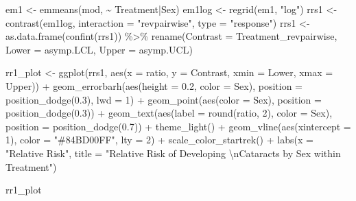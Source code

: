 \documentclass[
]{article}
\newenvironment{Shaded}{\begin{snugshade}}{\end{snugshade}}
\newcommand{\AttributeTok}[1]{\textcolor[rgb]{0.77,0.63,0.00}{#1}}
\newcommand{\DecValTok}[1]{\textcolor[rgb]{0.00,0.00,0.81}{#1}}
\newcommand{\FloatTok}[1]{\textcolor[rgb]{0.00,0.00,0.81}{#1}}
\newcommand{\FunctionTok}[1]{\textcolor[rgb]{0.00,0.00,0.00}{#1}}
\newcommand{\NormalTok}[1]{#1}
\newcommand{\OtherTok}[1]{\textcolor[rgb]{0.56,0.35,0.01}{#1}}
\newcommand{\SpecialCharTok}[1]{\textcolor[rgb]{0.00,0.00,0.00}{#1}}
\newcommand{\StringTok}[1]{\textcolor[rgb]{0.31,0.60,0.02}{#1}}
\begin{document}
\begin{Shaded}
\begin{Highlighting}[]
\NormalTok{em1 }\OtherTok{\textless{}{-}} \FunctionTok{emmeans}\NormalTok{(mod, }\SpecialCharTok{\textasciitilde{}}\NormalTok{ Treatment}\SpecialCharTok{|}\NormalTok{Sex)}
\NormalTok{em1log }\OtherTok{\textless{}{-}} \FunctionTok{regrid}\NormalTok{(em1, }\StringTok{"log"}\NormalTok{)}
\NormalTok{rrs1 }\OtherTok{\textless{}{-}} \FunctionTok{contrast}\NormalTok{(em1log, }\AttributeTok{interaction =} \StringTok{"revpairwise"}\NormalTok{, }\AttributeTok{type =} \StringTok{"response"}\NormalTok{)}
\NormalTok{rrs1 }\OtherTok{\textless{}{-}} \FunctionTok{as.data.frame}\NormalTok{(}\FunctionTok{confint}\NormalTok{(rrs1)) }\SpecialCharTok{\%\textgreater{}\%}
  \FunctionTok{rename}\NormalTok{(}\AttributeTok{Contrast =}\NormalTok{ Treatment\_revpairwise, }\AttributeTok{Lower =}\NormalTok{ asymp.LCL, }\AttributeTok{Upper =}\NormalTok{ asymp.UCL)}

\NormalTok{rr1\_plot }\OtherTok{\textless{}{-}} \FunctionTok{ggplot}\NormalTok{(rrs1, }\FunctionTok{aes}\NormalTok{(}\AttributeTok{x =}\NormalTok{ ratio, }\AttributeTok{y =}\NormalTok{ Contrast, }\AttributeTok{xmin =}\NormalTok{ Lower, }\AttributeTok{xmax =}\NormalTok{ Upper)) }\SpecialCharTok{+}
  \FunctionTok{geom\_errorbarh}\NormalTok{(}\FunctionTok{aes}\NormalTok{(}\AttributeTok{height =} \FloatTok{0.2}\NormalTok{, }\AttributeTok{color =}\NormalTok{ Sex),}
                 \AttributeTok{position =} \FunctionTok{position\_dodge}\NormalTok{(}\FloatTok{0.3}\NormalTok{), }\AttributeTok{lwd =} \DecValTok{1}\NormalTok{) }\SpecialCharTok{+}
  \FunctionTok{geom\_point}\NormalTok{(}\FunctionTok{aes}\NormalTok{(}\AttributeTok{color =}\NormalTok{ Sex), }\AttributeTok{position =} \FunctionTok{position\_dodge}\NormalTok{(}\FloatTok{0.3}\NormalTok{)) }\SpecialCharTok{+}
  \FunctionTok{geom\_text}\NormalTok{(}\FunctionTok{aes}\NormalTok{(}\AttributeTok{label =} \FunctionTok{round}\NormalTok{(ratio, }\DecValTok{2}\NormalTok{), }\AttributeTok{color =}\NormalTok{ Sex), }
            \AttributeTok{position =} \FunctionTok{position\_dodge}\NormalTok{(}\FloatTok{0.7}\NormalTok{)) }\SpecialCharTok{+}
  \FunctionTok{theme\_light}\NormalTok{() }\SpecialCharTok{+}
  \FunctionTok{geom\_vline}\NormalTok{(}\FunctionTok{aes}\NormalTok{(}\AttributeTok{xintercept =} \DecValTok{1}\NormalTok{), }\AttributeTok{color =} \StringTok{"\#84BD00FF"}\NormalTok{, }\AttributeTok{lty =} \DecValTok{2}\NormalTok{) }\SpecialCharTok{+}
  \FunctionTok{scale\_color\_startrek}\NormalTok{() }\SpecialCharTok{+}
  \FunctionTok{labs}\NormalTok{(}\AttributeTok{x =} \StringTok{"Relative Risk"}\NormalTok{,}
       \AttributeTok{title =} \StringTok{"Relative Risk of Developing }\SpecialCharTok{\textbackslash{}n}\StringTok{Cataracts by Sex within Treatment"}\NormalTok{)}

\NormalTok{rr1\_plot}
\end{Highlighting}
\end{Shaded}
\end{document}
